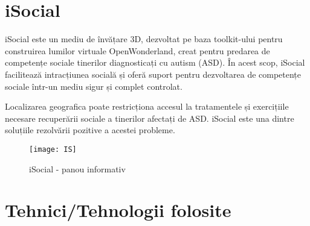\section{iSocial}

\par iSocial este un mediu de învățare 3D, dezvoltat pe baza toolkit-ului pentru construirea lumilor virtuale OpenWonderland, creat pentru predarea de competențe sociale tinerilor diagnosticați cu autism (ASD). În acest scop, iSocial facilitează intracțiunea socială și oferă suport pentru dezvoltarea de competențe sociale într-un mediu sigur și complet controlat.
\par Localizarea geografica poate restricționa accesul la tratamentele și exercițiile necesare recuperării sociale a tinerilor afectați de ASD. iSocial este una dintre soluțiile rezolvării pozitive a acestei probleme.

\begin{figure}[h]
    \centering
    \texttt{[image: IS]}
    \caption{iSocial - panou informativ }
    \label{fig:imag5}
\end{figure}

\section{Tehnici/Tehnologii folosite}

